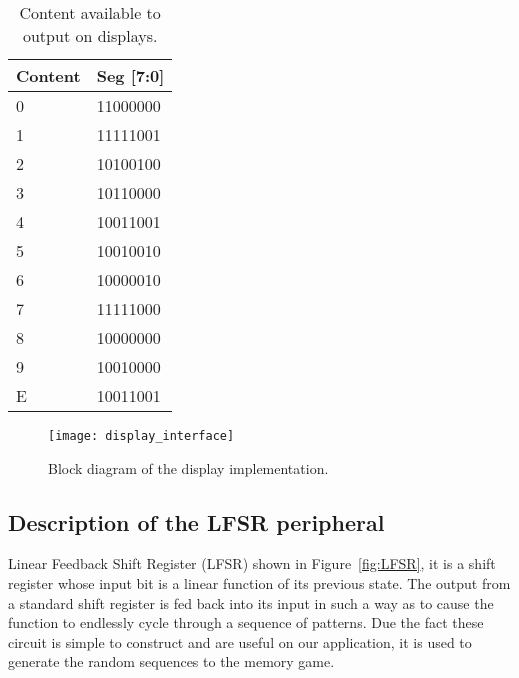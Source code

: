\vspace{10pt}
\begin{table}[!htbp]
\centering
    \begin{tabular}{|l|l|}
    \hline
    \textbf{Content} & \textbf{Seg {[}7:0{]}} \\ \hline
    0               & 11000000               \\ \hline
    1               & 11111001               \\ \hline
    2               & 10100100               \\ \hline
    3               & 10110000               \\ \hline
    4               & 10011001               \\ \hline
    5               & 10010010               \\ \hline
    6               & 10000010               \\ \hline
    7               & 11111000               \\ \hline
    8               & 10000000               \\ \hline
    9               & 10010000               \\ \hline
    E               & 10011001               \\ \hline
    \end{tabular}
    \caption{Content available to output on displays.}
    \label{tab:disp_values}
\end{table}

\clearpage
\begin{figure}[!htbp]
    \centerline{\texttt{[image: display\_interface]}}
    \vspace{0cm}\caption{Block diagram of the display implementation.}
    \label{fig:display_interface}
\end{figure}


\clearpage
\subsection{Description of the LFSR peripheral}
Linear Feedback Shift Register (LFSR) shown in Figure~\ref{fig:LFSR}, it is a shift register 
whose input bit is a linear function of its previous state. The output from a standard shift register is fed back into its input in such a 
way as to cause the function to endlessly cycle through a sequence of patterns. Due the fact these circuit is simple to construct
and are useful on our application, it is used to generate the random sequences to the memory game.

